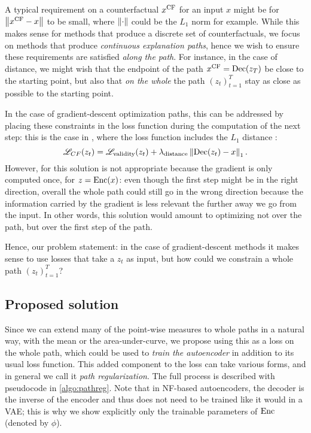 \documentclass[../main.tex]{subfiles}
\begin{document}
A typical requirement on a counterfactual $x^\text{CF}$ for an input $x$ might be for $\left\lVert x^\text{CF} - x\right\rVert$ to be small, where $\left\lVert\cdot\right\rVert$ could be the $L_1$ norm for example.
While this makes sense for methods that produce a discrete set of counterfactuals, we focus on methods that produce \emph{continuous explanation paths}, hence we wish to ensure these requirements are satisfied \emph{along the path}.
For instance, in the case of distance, we might wish that the endpoint of the path $x^\text{CF} = \operatorname{Dec}(z_T)$ be close to the starting point, but also that \emph{on the whole} the path $(z_t)_{t=1}^T$ stay as close as possible to the starting point.

In the case of gradient-descent optimization paths, this can be addressed by placing these constraints in the loss function during the computation of the next step: this is the case in \revise{}, where the loss function includes the $L_1$ distance \cite{joshiRealistic2019}:
$$
    \mathscr{L}_{CF}(z_t) = \mathscr{L}_\text{validity}(z_t) + \lambda_\text{distance} \left\lVert\operatorname{Dec}(z_t) - x\right\rVert_1.
$$
However, for \ls{} this solution is not appropriate because the gradient is only computed once, for $z = \operatorname{Enc}(x)$: even though the first step might be in the right direction, overall the whole path could still go in the wrong direction because the information carried by the gradient is less relevant the further away we go from the input.
In other words, this solution would amount to optimizing not over the path, but over the first step of the path.

Hence, our problem statement: in the case of gradient-descent methods it makes sense to use losses that take a $z_t$ as input, but how could we constrain a whole path $(z_t)_{t=1}^T$?

\subsection{Proposed solution}

Since we can extend many of the point-wise measures to whole paths in a natural way, \eg{} with the mean or the area-under-curve, we propose using this as a loss on the whole path, which could be used to \emph{train the autoencoder} in addition to its usual loss function.
This added component to the loss can take various forms, and in general we call it \emph{path regularization}. The full process is described with pseudocode in \autoref{algo:pathreg}.
Note that in NF-based autoencoders, the decoder is the inverse of the encoder and thus does not need to be trained like it would in a VAE; this is why we show explicitly only the trainable parameters of $\operatorname{Enc}$ (denoted by $\phi$).
\end{document}
